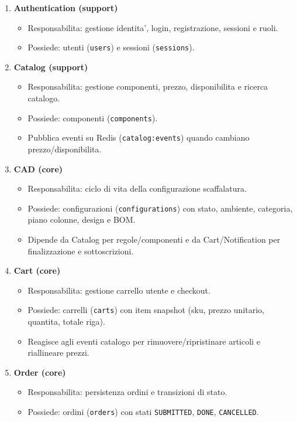 \begin{enumerate}
\item \textbf{Authentication (support)}
\begin{itemize}
\item Responsabilita: gestione identita', login, registrazione, sessioni e ruoli.
\item Possiede: utenti (\texttt{users}) e sessioni (\texttt{sessions}).
\end{itemize}

\item \textbf{Catalog (support)}
\begin{itemize}
\item Responsabilita: gestione componenti, prezzo, disponibilita e ricerca catalogo.
\item Possiede: componenti (\texttt{components}).
\item Pubblica eventi su Redis (\texttt{catalog:events}) quando cambiano prezzo/disponibilita.
\end{itemize}

\item \textbf{CAD (core)}
\begin{itemize}
\item Responsabilita: ciclo di vita della configurazione scaffalatura.
\item Possiede: configurazioni (\texttt{configurations}) con stato, ambiente, categoria, piano colonne, design e BOM.
\item Dipende da Catalog per regole/componenti e da Cart/Notification per finalizzazione e sottoscrizioni.
\end{itemize}

\item \textbf{Cart (core)}
\begin{itemize}
\item Responsabilita: gestione carrello utente e checkout.
\item Possiede: carrelli (\texttt{carts}) con item snapshot (sku, prezzo unitario, quantita, totale riga).
\item Reagisce agli eventi catalogo per rimuovere/ripristinare articoli e riallineare prezzi.
\end{itemize}

\item \textbf{Order (core)}
\begin{itemize}
\item Responsabilita: persistenza ordini e transizioni di stato.
\item Possiede: ordini (\texttt{orders}) con stati \texttt{SUBMITTED}, \texttt{DONE}, \texttt{CANCELLED}.
\end{itemize}


\end{enumerate}
